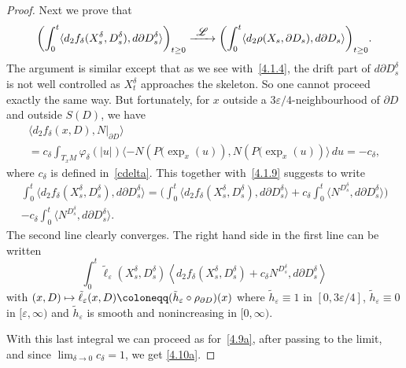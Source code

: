 \documentclass[10pt]{amsart}
\newcommand\mto{\mathchoice{\longmapsto}{\mapsto}{\mapsto}{\mapsto}}
\newcommand\To[1]{\mathchoice{\xrightarrow{\textstyle\kern4pt#1\kern3pt}}{\stackrel{#1}{\longrightarrow}}{}{}}
\theoremstyle{plain}
\theoremstyle{definition}
\newcommand{\SL}{{\mathscr L}}
\newcommand\df{\coloneqq}
\let\d\delta
\let\e\varepsilon
\begin{document}
\begin{proof}
Next we prove that\vspace*{-3pt}
\begin{equation}
\label{4.10}
\biggl(\int_0^t\langle d_2f_\d(X_s^\d, D_s^\d), d\partial D_s^\d\rangle\biggr)_{t\ge 0}\To{\SL}\biggl(\int_0^t\langle d_2\rho (X_s,\partial D_s), d\partial D_s\rangle\biggr)_{t\ge 0}.
\end{equation}
The argument is similar except that as we see with~\eqref{4.1.4}, the drift part of $d\partial D_s^\d$ is not well controlled as $X_t^\d$ approaches the skeleton. So one cannot proceed exactly the same way. But fortunately, for $x$ outside a $3\e/4$-neighbourhood of $\partial D$ and outside $S(D)$, we have\vspace*{-3pt}
\begin{multline}
\label{4.10a}
\langle d_2 f_\d(x,D), N|_{\partial D}\rangle \\[-3pt]
=c_\d\int_{T_xM}\varphi_\d(\vert u\vert )\langle -N\left(P(\exp_x(u)\right), N\left(P(\exp_x(u)\right)\rangle \, du=-c_\d,
\end{multline}
where $c_\d$ is defined in~\eqref{cdelta}.
This together with~\eqref{4.1.9} suggests to write\vspace*{-3pt}
\begin{multline*}
\int_0^t\langle d_2f_\d(X_s^\d, D_s^\d), d\partial D_s^\d\rangle=\biggl(\int_0^t\langle d_2f_\d(X_s^\d, D_s^\d), d\partial D_s^\d\rangle+ c_\d \int_0^t \langle N^{D^{\d}_s}, d \partial D^{\d}_s \rangle \biggr)\\[-3pt]
-c_\d\int_0^t \langle N^{D^{\d}_s}, d \partial D^{\d}_s \rangle.
\end{multline*}
The second line clearly converges. The
right hand side in the first line can be written\vspace*{-3pt}
\begin{equation}
\int_0^t\tilde\ell_{\e}(X_s^\d, D_s^\d) \left\langle d_2f_\d(X_s^\d, D_s^\d)+c_\d N^{D^{\d}_s}, d\partial D_s^\d\right\rangle
\end{equation}
with
$(x,D)\mto \tilde\ell_\e(x,D)\df(\tilde h_\e\circ \rho_{\partial D})(x)$ where $\tilde h_\e\equiv 1$ in $[0,3\e/4]$, $\tilde h_\e\equiv 0$ in $[\e,\infty)$ and $\tilde h_\e$ is smooth and nonincreasing in $[0,\infty)$.

With this last integral we can proceed as for~\eqref{4.9a}, after passing to the limit, and since $ \lim_{\d \to 0} c_\d = 1$, we get \eqref{4.10a}.


\end{proof}
\end{document}
